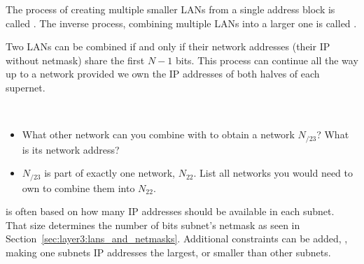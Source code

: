 The process of creating multiple smaller LANs from a single address block is called .
The inverse process, combining multiple LANs into a larger one is called . 

Two  LANs can be combined if and only if their network addresses 
(their IP without netmask) share the first $N-1$ bits. This process can continue all the way 
up to a  network provided we own the IP addresses of both halves of each supernet.

\begin{exercise}\ \\[-0.5cm]
\begin{itemize}
\item What other network can you combine with 
to obtain a  network $N_{/23}$? What is its network address?

\item $N_{/23}$ is part of exactly one  network, $N_{22}$. 
  List all  networks you would need to own to combine them into $N_{22}$.
\end{itemize}
\end{exercise}

 is often based on how many IP addresses should be 
available in each subnet. 
That size determines the number of bits subnet's netmask as seen in Section~\ref{sec:layer3:lans_and_netmasks}.
Additional constraints can be added, \eg, making one subnets IP addresses the largest,
or smaller than other subnets. 

